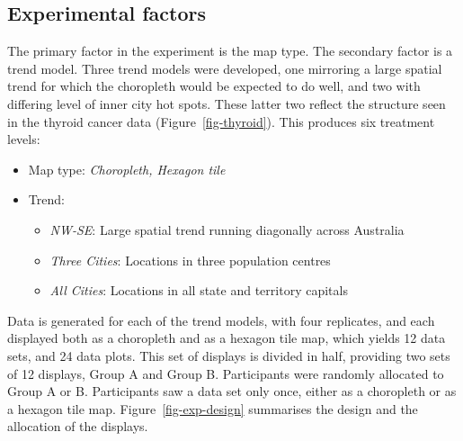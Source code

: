 \documentclass[
doublespace,
  times]{anzsauth}
\providecommand{\tightlist}{%
  \setlength{\itemsep}{0pt}\setlength{\parskip}{0pt}}
\begin{document}
\subsection{Experimental factors}\label{experimental-factors}

The primary factor in the experiment is the map type. The secondary
factor is a trend model. Three trend models were developed, one
mirroring a large spatial trend for which the choropleth would be
expected to do well, and two with differing level of inner city hot
spots. These latter two reflect the structure seen in the thyroid cancer
data (Figure~\ref{fig-thyroid}). This produces six treatment levels:

\begin{itemize}
\item
  Map type: \emph{Choropleth, Hexagon tile}
\item
  Trend:

  \begin{itemize}
  \tightlist
  \item
    \emph{NW-SE}: Large spatial trend running diagonally across
    Australia
  \item
    \emph{Three Cities}: Locations in three population centres
  \item
    \emph{All Cities}: Locations in all state and territory capitals
  \end{itemize}
\end{itemize}

Data is generated for each of the trend models, with four replicates,
and each displayed both as a choropleth and as a hexagon tile map, which
yields 12 data sets, and 24 data plots. This set of displays is divided
in half, providing two sets of 12 displays, Group A and Group B.
Participants were randomly allocated to Group A or B. Participants saw a
data set only once, either as a choropleth or as a hexagon tile map.
Figure~\ref{fig-exp-design} summarises the design and the allocation of
the displays.
\end{document}
